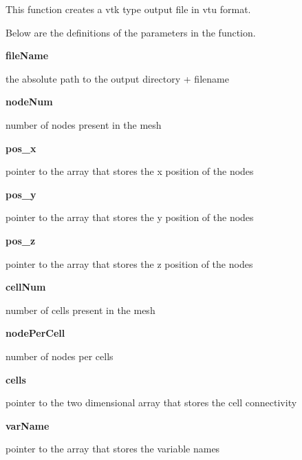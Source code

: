 \documentclass{article}
\begin{document}

\bigskip

        \par This function creates a vtk type output file in vtu format.
\bigskip
        
        \par Below are the definitions of the parameters in the function.
\medskip

        {\bf fileName}  \par the absolute path to the output directory + filename
\medskip
        
        {\bf nodeNum} \par number of nodes present in the mesh
\medskip
        
        {\bf pos\_x} \par pointer to the array that stores the x position of the nodes
\medskip
        
        {\bf pos\_y} \par pointer to the array that stores the y position of the nodes
\medskip
        
        {\bf pos\_z} \par pointer to the array that stores the z position of the nodes
\medskip
        
        {\bf cellNum} \par number of cells present in the mesh
\medskip
        
        {\bf nodePerCell} \par number of nodes per cells 
\medskip
        
        {\bf cells} \par pointer to the two dimensional array that stores the cell connectivity
\medskip
        
        {\bf varName} \par pointer to the array that stores the variable names
\medskip
        
\end{document}
